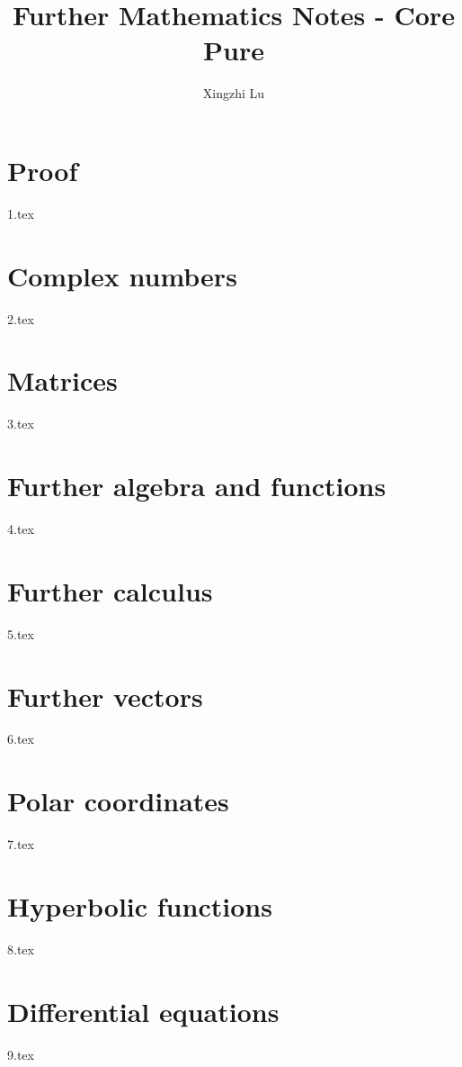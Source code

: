\documentclass[A4paper]{article}
\title{Further Mathematics Notes - Core Pure}
\author{Xingzhi Lu}
\begin{document}
	\maketitle
	\tableofcontents
	\pagebreak
	\section{Proof} %
	{1.tex} \pagebreak
	
	\section{Complex numbers} %
	{2.tex} \pagebreak
	
	\section{Matrices} %
	{3.tex} \pagebreak
	
	\section{Further algebra and functions} %
	{4.tex} \pagebreak
	
	\section{Further calculus}
	{5.tex} \pagebreak
	
	\section{Further vectors} %
	{6.tex} \pagebreak
	
	\section{Polar coordinates} %
	{7.tex} \pagebreak
	
	\section{Hyperbolic functions}
	{8.tex} \pagebreak
	
	\section{Differential equations}
	{9.tex}

	
	
	\pagebreak
	
	
\end{document}
